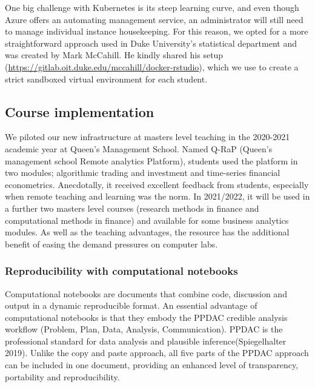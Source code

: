 \documentclass{article}
\begin{document}
One big challenge with Kubernetes is its steep learning curve, and even
though Azure offers an automating management service, an administrator
will still need to manage individual instance housekeeping. For this
reason, we opted for a more straightforward approach used in Duke
University's statistical department and was created by Mark McCahill. He
kindly shared his setup
(\url{https://gitlab.oit.duke.edu/mccahill/docker-rstudio}), which we
use to create a strict sandboxed virtual environment for each student.

\hypertarget{course-implementation}{%
\subsection{Course implementation}\label{course-implementation}}

We piloted our new infrastructure at masters level teaching in the
2020-2021 academic year at Queen's Management School. Named Q-RaP
(Queen's management school Remote analytics Platform), students used the
platform in two modules; algorithmic trading and investment and
time-series financial econometrics. Anecdotally, it received excellent
feedback from students, especially when remote teaching and learning was
the norm. In 2021/2022, it will be used in a further two masters level
courses (research methods in finance and computational methods in
finance) and available for some business analytics modules. As well as
the teaching advantages, the resource has the additional benefit of
easing the demand pressures on computer labs.

\hypertarget{reproducibility-with-computational-notebooks}{%
\subsubsection{Reproducibility with computational
notebooks}\label{reproducibility-with-computational-notebooks}}

Computational notebooks are documents that combine code, discussion and
output in a dynamic reproducible format. An essential advantage of
computational notebooks is that they embody the PPDAC credible analysis
workflow (Problem, Plan, Data, Analysis, Communication). PPDAC is the
professional standard for data analysis and plausible
inference(Spiegelhalter 2019). Unlike the copy and paste approach, all
five parts of the PPDAC approach can be included in one document,
providing an enhanced level of transparency, portability and
reproducibility.
\end{document}
